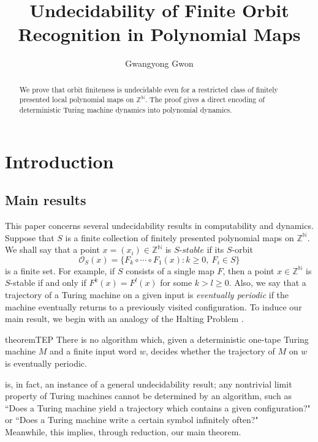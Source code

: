 \documentclass{amsart}
\theoremstyle{definition}
\theoremstyle{remark}
\numberwithin{equation}{section}
\newcommand{\Z}{\mathbb{Z}}
\newcommand{\N}{\mathbb{N}}
\begin{document}
\title[Undecidability of Finite Orbit Recognition in Polynomial Maps]{Undecidability of Finite Orbit Recognition in Polynomial Maps}

\author{Gwangyong Gwon}
\address{Department of Mathematical Science, Seoul National University, Seoul, Korea}

\begin{abstract}
We prove that orbit finiteness is undecidable even for a restricted class of finitely presented local polynomial maps on $\Z^\N$.
The proof gives a direct encoding of deterministic Turing machine dynamics into polynomial dynamics.%
\end{abstract}

\maketitle
\section{Introduction}%
\subsection{Main results}
This paper concerns several undecidability results in computability and dynamics.
Suppose that \(S\) is a finite collection of finitely presented polynomial maps on \(\Z^\N\).
We shall say that a point \(x=(x_i)\in\Z^\N\) is \(S\textrm{-}stable\) if its \(S\textrm{-}\)orbit
\[\mathcal{O}_S(x)=\{F_k\circ\cdots\circ F_1(x):k\ge0,\ F_i\in S\}\]
is a finite set.
For example, if \(S\) consists of a single map $F$, then a point $x\in\Z^\N$ is $S$-stable if and only if $F^k(x)=F^l(x)$ for some $k>l\ge0$.
Also, we  say that a trajectory of a Turing machine on a given input is \textit{eventually periodic} if the machine eventually returns to a previously visited configuration.
To induce our main result, we begin with an analogy of the Halting Problem \cite{turing1936}.

\begin{restatable}{theorem}{TEP}\label{und_tep}
There is no algorithm which, given a deterministic one-tape Turing machine $M$ and a finite input word $w$, decides whether the trajectory of $M$ on $w$ is eventually periodic.
\end{restatable}

 is, in fact, an instance of a general undecidability result;
any nontrivial limit property of Turing machines cannot be determined by an algorithm, such as ``Does a Turing machine yield a trajectory which contains a given configuration?" or ``Does a Turing machine write a certain symbol infinitely often?"\\
Meanwhile, this implies, through reduction, our main theorem.
\end{document}

